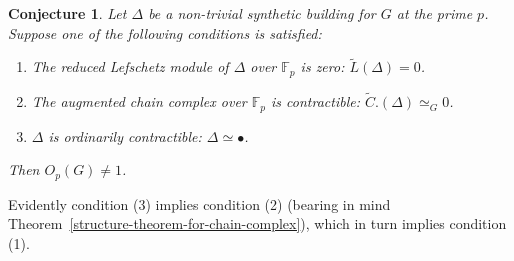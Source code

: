 \documentclass[12pt]{amsart}
\theoremstyle{plain}
\newtheorem{conjecture}[theorem]{Conjecture}
\theoremstyle{definition}
\theoremstyle{remark}
\numberwithin{equation}{section}
\def\FF{{\mathbb F}}
\begin{document}
\begin{conjecture}
    Let $\Delta$ be a non-trivial synthetic building for $G$ at the prime $p$. Suppose one of the following conditions is satisfied:
\begin{enumerate}
    \item The reduced Lefschetz module of $\Delta$ over $\FF_p$ is zero: $\tilde L(\Delta)=0$.
    \item The augmented chain complex over $\FF_p$ is contractible: $\tilde C.(\Delta)\simeq_G 0$.
    \item $\Delta$ is ordinarily contractible: $\Delta\simeq \bullet$.
\end{enumerate}
Then $O_p(G)\ne 1$.
\end{conjecture}

Evidently condition (3) implies condition (2) (bearing in mind Theorem~\ref{structure-theorem-for-chain-complex}), which in turn implies condition (1).
\end{document}

